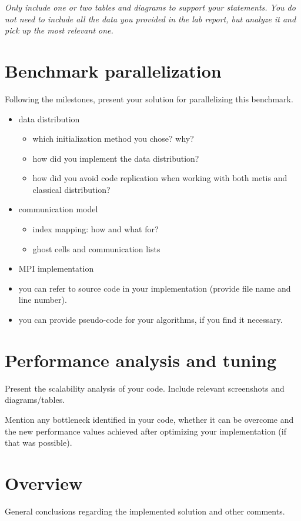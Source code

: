 \documentclass[12pt, a4paper]{article}
\newcommand{\draft}[1]{\textcolor{NavyBlue}{#1}}
\newcommand{\hint}[1]{\textcolor{OliveGreen}{{\it#1}}}
\begin{document}
\hint{Only include one or two tables and diagrams to support your statements. You do not need to include all the data you provided in the lab report, but analyze it and pick up the most relevant one.}

\section{Benchmark parallelization}
\draft{Following the milestones, present your solution for parallelizing this benchmark.
\begin{itemize}
	\item data distribution
	\begin{itemize}
		\item which initialization method you chose? why?
		\item how did you implement the data distribution?
		\item how did you avoid code replication when working with both metis and classical distribution?
	\end{itemize}
	\item communication model
	\begin{itemize}
		\item index mapping: how and what for?
		\item ghost cells and communication lists
	\end{itemize}
	\item MPI implementation
\end{itemize}
}
\hint{\begin{itemize}
	\item you can refer to source code in your implementation (provide file name and line number).
	\item you can provide pseudo-code for your algorithms, if you find it necessary.
\end{itemize}}

\section{Performance analysis and tuning}
\draft{
Present the scalability analysis of your code. Include relevant screenshots and diagrams/tables.}

\draft{
Mention any bottleneck identified in your code, whether it can be overcome and the new performance values achieved after optimizing your implementation (if that was possible).
}

\section{Overview}
\draft{
General conclusions regarding the implemented solution and other comments.
}
\end{document}
